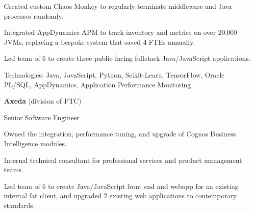 \documentclass[letterpaper,MMMMyyyy,nonstopmode]{simpleresumecv}
\newif\ifLOCATION
\newif\ifLONG
\begin{document}
\begin{Body}
\begin{Detail}

\BulletItem
Created custom Chaos Monkey to regularly terminate middleware and Java processes randomly. 

\BulletItem
Integrated AppDynamics APM to track inventory and metrics on over 20,000 JVMs, replacing a bespoke system that saved 4 FTEs annually.

\BulletItem
Led team of 6 to create three public-facing fullstack Java/JavaScript applications.

\Gap
Technologies: Java, JavaScript, Python, Scikit-Learn, TensorFlow, Oracle PL/SQL, AppDynamics, Application Performance Monitoring
\fi

\end{Detail}

\BigGap

\Entry
\textbf{Axeda} (division of PTC)
\hfill 

Senior Software Engineer
\ifLOCATION
\hfill
Rochester, New York
\fi

\begin{Detail}
Owned the integration, performance tuning, and upgrade of Cognos Business Intelligence modules.

Internal technical consultant for professional services and product management teams.

\end{Detail}

\ifLONG

\BigGap
\Entry
\href{http://www.paychex.com/}
{\textbf{Paychex}}
\hfill 
\DatestampY{2005} -- \DatestampY{2010}

Lead Developer
\ifLOCATION
\hfill
Rochester, New York
\fi

\begin{Detail}
Led team of 6 to create Java/JavaScript front end and webapp for an existing internal fat client, and upgraded 2 existing web applications to contemporary standards. 


\end{Detail}
\end{Body}
\end{document}
